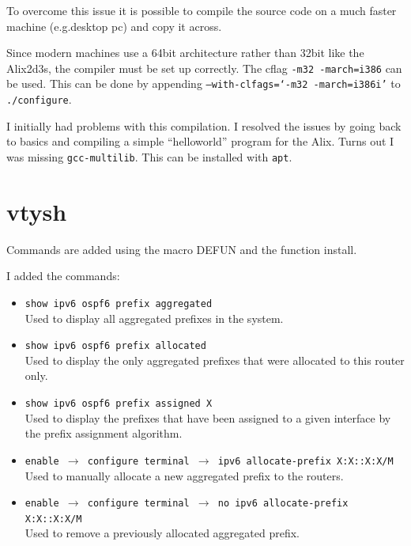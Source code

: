 To overcome this issue it is possible to compile the source code on a much
faster machine (e.g.\@ desktop pc) and copy it across. 

Since modern machines use a 64bit architecture rather than 32bit like the
Alix2d3s, the compiler must be set up correctly. The cflag \texttt{-m32
-march=i386} can be used. This can be done by appending
\texttt{--with-clfags=`-m32 -march=i386i'} to \texttt{\@./configure}.

I initially had problems with this compilation. I resolved the issues by going
back to basics and compiling a simple ``helloworld'' program for the
Alix.  Turns out I was missing \texttt{gcc-multilib}. This can be installed
with \texttt{apt}.

\chapter{vtysh}
\label{vtysh}
Commands are added using the macro DEFUN and the function install.

I added the commands:
\begin{itemize}
	\item \texttt{show ipv6 ospf6 prefix aggregated} \\
		Used to display all aggregated prefixes in the system.
	\item \texttt{show ipv6 ospf6 prefix allocated} \\ 
		Used to display the only aggregated prefixes that were allocated to this
		router only.
	\item \texttt{show ipv6 ospf6 prefix assigned X} \\
		Used to display the prefixes that have been assigned to a given interface
		by the prefix assignment algorithm. 


	\item \texttt{enable $\rightarrow$ configure terminal 
		$\rightarrow$ ipv6 allocate-prefix X:X::X:X/M} \\
		Used to manually allocate a new aggregated prefix to the routers.
	\item \texttt{enable $\rightarrow$ configure terminal
		$\rightarrow$ no ipv6 allocate-prefix X:X::X:X/M} \\
		Used to remove a previously allocated aggregated prefix.
\end{itemize}
\pagebreak

